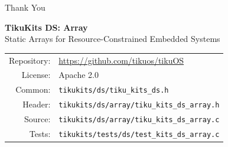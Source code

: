 \documentclass[aspectratio=169, 10pt]{beamer}
\begin{document}
\begin{frame}{Thank You}
\begin{center}
\Large\textbf{TikuKits DS: Array}\\[0.5em]
\normalsize Static Arrays for Resource-Constrained Embedded Systems\\[1.5em]

\begin{tabular}{rl}
  Repository: & \url{https://github.com/tikuos/tikuOS} \\
  License:    & Apache 2.0 \\
  Common:     & \texttt{tikukits/ds/tiku\_kits\_ds.h} \\
  Header:     & \texttt{tikukits/ds/array/tiku\_kits\_ds\_array.h} \\
  Source:     & \texttt{tikukits/ds/array/tiku\_kits\_ds\_array.c} \\
  Tests:      & \texttt{tikukits/tests/ds/test\_kits\_ds\_array.c} \\
\end{tabular}
\end{center}
\end{frame}
\end{document}
